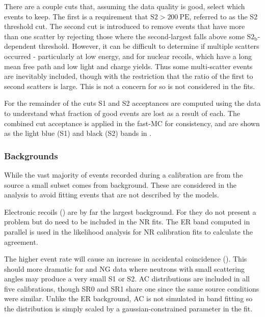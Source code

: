 There are a couple cuts that, assuming the data quality is good, select which events to keep.  The first is a requirement that
$\mathrm{S2} > 200\ \mathrm{PE}$, referred to as the S2 threshold cut.  The second cut is introduced to remove events that have more than
one scatter by rejecting those where the second-largest \stwob falls above some $\mathrm{S2_b}$-dependent threshold.  However, it can be
difficult to determine if multiple scatters occurred - particularly at low energy, and for nuclear
recoils, which have a long mean free path and low light and charge yields.  Thus some multi-scatter events are inevitably included,
though with the restriction that the ratio of the first to second scatters is large.  This is not a concern for  so is not
considered in the fits.

For the remainder of the cuts S1 and S2 acceptances are computed using the data to understand what fraction of good events are lost
as a result of each.  The combined cut acceptance is applied in the fast-MC for consistency, and are shown as the light blue (S1) and
black (S2) bands in .



\subsubsection{Backgrounds}
\label{subsubsec:er_nr_calibrations_parameter_determ_additional_components}
While the vast majority of events recorded during a calibration are from the source a small subset comes
from background.  These are considered in the analysis to avoid fitting events that are not described by the models.

Electronic recoils () are by far the largest background.  For 
they do not present a problem but do need to be included in the NR fits.  The ER band computed in parallel is used in the likelihood
analysis for NR calibration fits to calculate the agreement.

The higher event rate will cause an increase in accidental coincidence ().  This should more dramatic
for \ambe and NG data where neutrons with small scattering angles may produce a very small S1 or S2.  AC distributions are included
in all five calibrations, though SR0 and SR1 \ambe share one since the same source conditions were similar.  Unlike the ER background,
AC is not simulated in band fitting so the distribution is simply scaled by a gaussian-constrained parameter in the fit.

